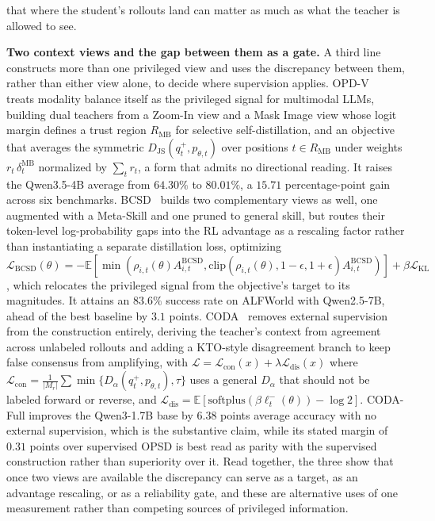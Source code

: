 \documentclass{article} %
\newcommand{\E}{\mathbb{E}}
\newcommand{\loss}{\mathcal{L}}
\begin{document}
that where the student's rollouts land can matter as much as what the teacher is allowed to see.

\textbf{Two context views and the gap between them as a gate.} A third line constructs more than one privileged view and uses the discrepancy between them, rather than either view alone, to decide where supervision applies. OPD-V~\citep{2608.05131} treats modality balance itself as the privileged signal for multimodal LLMs, building dual teachers from a Zoom-In view and a Mask Image view whose logit margin defines a trust region $R_{\text{MB}}$ for selective self-distillation, and an objective that averages the symmetric $D_{\mathrm{JS}}(q^+_t, p_{\theta,t})$ over positions $t \in R_{\text{MB}}$ under weights $r_t\, \delta^{\text{MB}}_t$ normalized by $\sum_t r_t$, a form that admits no directional reading. It raises the Qwen3.5-4B average from $64.30\%$ to $80.01\%$, a $15.71$ percentage-point gain across six benchmarks. BCSD~\citep{2608.09555} builds two complementary views as well, one augmented with a Meta-Skill and one pruned to general skill, but routes their token-level log-probability gaps into the RL advantage as a rescaling factor rather than instantiating a separate distillation loss, optimizing $\loss_{\text{BCSD}}(\theta) = -\E[\min(\rho_{i,t}(\theta) A^{\text{BCSD}}_{i,t}, \mathrm{clip}(\rho_{i,t}(\theta), 1-\epsilon, 1+\epsilon) A^{\text{BCSD}}_{i,t})] + \beta \loss_{\text{KL}}$, which relocates the privileged signal from the objective's target to its magnitudes. It attains an $83.6\%$ success rate on ALFWorld with Qwen2.5-7B, ahead of the best baseline by $3.1$ points. CODA~\citep{2608.08764} removes external supervision from the construction entirely, deriving the teacher's context from agreement across unlabeled rollouts and adding a KTO-style disagreement branch to keep false consensus from amplifying, with $\loss = \loss_{\text{con}}(x) + \lambda \loss_{\text{dis}}(x)$ where $\loss_{\text{con}} = \frac{1}{|M_r|}\sum \min\{D_\alpha(q^+_t, p_{\theta,t}), \tau\}$ uses a general $D_\alpha$ that should not be labeled forward or reverse, and $\loss_{\text{dis}} = \E[\mathrm{softplus}(\beta \ell^-_t(\theta)) - \log 2]$. CODA-Full improves the Qwen3-1.7B base by $6.38$ points average accuracy with no external supervision, which is the substantive claim, while its stated margin of $0.31$ points over supervised OPSD is best read as parity with the supervised construction rather than superiority over it. Read together, the three show that once two views are available the discrepancy can serve as a target, as an advantage rescaling, or as a reliability gate, and these are alternative uses of one measurement rather than competing sources of privileged information.
\end{document}
